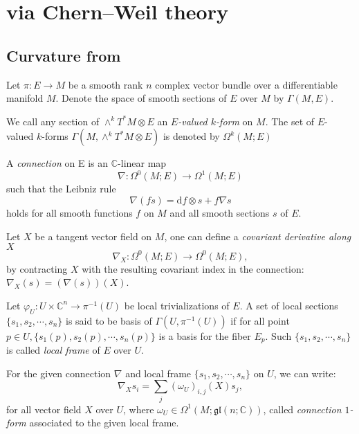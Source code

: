 \documentclass[11pt]{homework}
\begin{document}
\section{via Chern–Weil theory}
\subsection{Curvature from}
Let $\pi: E\to M$ be a smooth rank $n$ complex vector bundle over a differentiable manifold $M$. Denote the space of smooth sections of $E$ over $M$ by $\Gamma(M,E)$. 

\begin{definition}
    We call any section of $\wedge^k T^*M \otimes E$ an \textit{$E$-valued $k$-form} on $M$. The set of $E$-valued $k$-forms $\Gamma (M, \wedge^k T^{*}M\otimes E)$ is denoted by $\Omega^k(M;E)$
\end{definition}

\begin{definition}
    A \textit{connection} on E is an $\mathbb {C}$-linear map
    \begin{equation*}
        \nabla :\Omega^0(M;E)\to \Omega^1(M;E)
    \end{equation*}
    such that the Leibniz rule
    \begin{equation*}
        \nabla (fs)=\mathrm{d}f\otimes s+f\nabla s
    \end{equation*}
    holds for all smooth functions $f$ on $M$ and all smooth sections $s$ of $E$.

    Let $X$ be a tangent vector field on $M$, one can define a \textit{covariant derivative along} $X$
    \begin{equation*}
        \nabla _{X}:\Omega^{0}(M;E)\to \Omega^{0}(M;E),
    \end{equation*}
    by contracting $X$ with the resulting covariant index in the connection: $\nabla _{X}(s)=(\nabla (s))(X)$. 
\end{definition}

\begin{definition}
    Let $\varphi_U: U \times \mathbb{C}^n \rightarrow \pi^{-1}(U)$ be local trivializations of $E$. A set of local sections $\{s_1, s_2, \cdots, s_n\}$ is said to be basis of $\Gamma(U,\pi^{-1}(U))$ if for all point $p \in U, \{s_1(p), s_2(p), \cdots, s_n(p)\}$ is a basis for the fiber $E_p$. Such $\{s_1, s_2, \cdots, s_n\}$ is called \textit{local frame} of $E$ over $U$.
\end{definition}

\begin{definition}
    For the given connection $\nabla$ and local frame $\{s_1, s_2, \cdots, s_n\}$ on $U$, we can write:
    \begin{equation*}
        \nabla_X s_i = \sum_j \left(\omega_U\right)_{i,j}(X) s_j,
    \end{equation*}
    for all vector field $X$ over $U$, where $\omega_U \in \Omega^1(M;\mathfrak{gl}(n;\mathbb{C}))$, called \textit{connection $1$-form} associated to the given local frame.
\end{definition}
 
\end{document}
